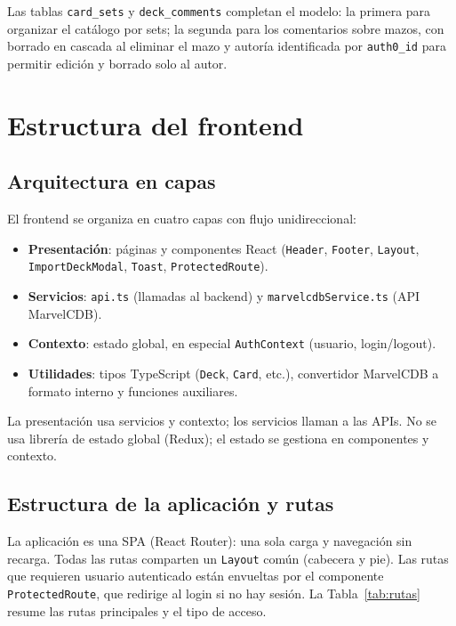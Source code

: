 Las tablas \texttt{card\_sets} y \texttt{deck\_comments} completan el modelo: la primera para organizar el catálogo por sets; la segunda para los comentarios sobre mazos, con borrado en cascada al eliminar el mazo y autoría identificada por \texttt{auth0\_id} para permitir edición y borrado solo al autor.

\section{Estructura del frontend}
\label{sec:estructura-frontend}

\subsection{Arquitectura en capas}

El frontend se organiza en cuatro capas con flujo unidireccional:
\begin{itemize}
    \item \textbf{Presentación}: páginas y componentes React (\texttt{Header}, \texttt{Footer}, \texttt{Layout}, \texttt{ImportDeckModal}, \texttt{Toast}, \texttt{ProtectedRoute}).
    \item \textbf{Servicios}: \texttt{api.ts} (llamadas al backend) y \texttt{marvelcdbService.ts} (API MarvelCDB).
    \item \textbf{Contexto}: estado global, en especial \texttt{AuthContext} (usuario, login/logout).
    \item \textbf{Utilidades}: tipos TypeScript (\texttt{Deck}, \texttt{Card}, etc.), convertidor MarvelCDB a formato interno y funciones auxiliares.
\end{itemize}
La presentación usa servicios y contexto; los servicios llaman a las APIs. No se usa librería de estado global (Redux); el estado se gestiona en componentes y contexto.

\subsection{Estructura de la aplicación y rutas}

La aplicación es una SPA (React Router): una sola carga y navegación sin recarga. Todas las rutas comparten un \texttt{Layout} común (cabecera y pie). Las rutas que requieren usuario autenticado están envueltas por el componente \texttt{ProtectedRoute}, que redirige al login si no hay sesión. La Tabla~\ref{tab:rutas} resume las rutas principales y el tipo de acceso.

